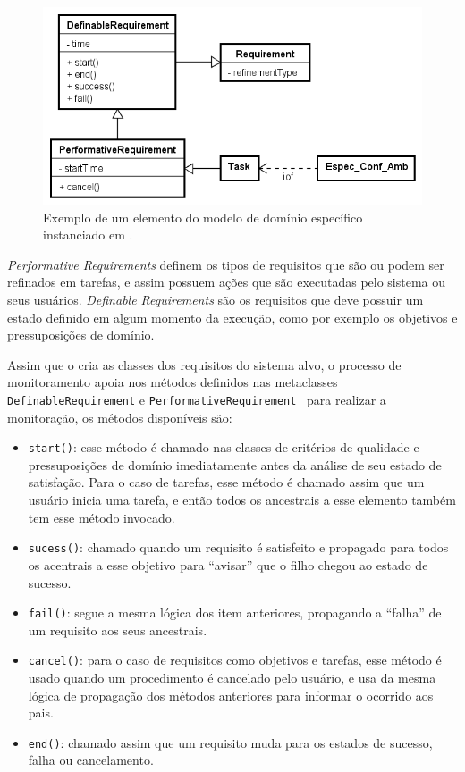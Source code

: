 \begin{figure}[h]
	\centering
	\includegraphics[width=1\textwidth]{figuras/exemplos-emf/exemplo-instanciacao-ecore.PNG}
	\caption{Exemplo de um elemento do modelo de domínio específico instanciado em \zanshin.}
	\label{exemplo-instanciacao-ecore}
\end{figure}

\textit{Performative Requirements} definem os tipos de requisitos que são ou podem ser refinados em tarefas, e assim possuem ações que são executadas pelo sistema ou seus usuários. \textit{Definable Requirements} são os requisitos que deve possuir um estado definido em algum momento da execução, como por exemplo os objetivos e pressuposições de domínio.

Assim que o \zanshin cria as classes dos requisitos do sistema alvo, o processo de monitoramento apoia nos métodos definidos nas metaclasses \texttt{DefinableRequirement} e \texttt{PerformativeRequirement}~\cite{tesevitor} para realizar a monitoração, os métodos disponíveis são:
\begin{itemize}
	\item \texttt{start()}: esse método é chamado nas classes de critérios de qualidade e pressuposições de domínio imediatamente antes da análise de seu estado de satisfação. Para o caso de tarefas, esse método é chamado assim que um usuário inicia uma tarefa, e então todos os ancestrais a esse elemento também tem esse método invocado.
	\item \texttt{sucess()}: chamado quando um requisito é satisfeito e propagado para todos os acentrais a esse objetivo para ``avisar'' que o filho chegou ao estado de sucesso.
	\item \texttt{fail()}: segue a mesma lógica dos item anteriores, propagando a ``falha'' de um requisito aos seus ancestrais.
	\item \texttt{cancel()}: para o caso de requisitos como objetivos e tarefas, esse método é usado quando um procedimento é cancelado pelo usuário, e usa da mesma lógica de propagação dos métodos anteriores para informar o ocorrido aos pais.
	\item \texttt{end()}: chamado assim que um requisito muda para os estados de sucesso, falha ou cancelamento.
\end{itemize}

